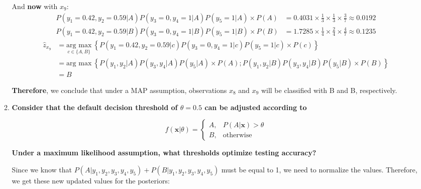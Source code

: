 \documentclass[12pt]{article}
\begin{document}
\begin{enumerate}[leftmargin=\labelsep]
\begin{enumerate}
                And \textbf{now} with $x_9$:
                $$
                  \begin{aligned}
                    P(y_1 = 0.42, y_2 = 0.59 | A) P(y_3 = 0, y_4 = 1 | A) P(y_5 = 1 | A) \times P(A) & = 0.4031 \times \frac{1}{3} \times \frac{1}{3} \times \frac{3}{7} \approx 0.0192 \\
                    P(y_1 = 0.42, y_2 = 0.59 | B) P(y_3 = 0, y_4 = 1 | B) P(y_5 = 1 | B) \times P(B) & = 1.7285 \times \frac{1}{4} \times \frac{2}{4} \times \frac{4}{7} \approx 0.1235
                  \end{aligned}
                $$
                $$
                  \begin{aligned}
                    \hat{z}_{x_9} & = \underset{c \in \{A, B\}}{\text{arg max}} \medspace \left\{P(y_1 = 0.42, y_2 = 0.59 | c) P(y_3 = 0, y_4 = 1 | c) P(y_5 = 1 | c) \times P(c)\right\}    \\
                                  & = \text{arg max} \medspace \left\{P(y_1, y_2 | A) P(y_3, y_4 | A) P(y_5 | A) \times P(A); P(y_1, y_2 | B) P(y_3, y_4 | B) P(y_5 | B) \times P(B)\right\} \\
                                  & = B
                  \end{aligned}
                $$

                \textbf{Therefore}, we conclude that under a MAP assumption, observations $x_8$ and $x_9$ will be classified with B and B, respectively.

          \item \textbf{Consider that the default decision threshold of $\theta = 0.5$ can be adjusted according to}

                \[
                  f(\textbf{x}|\theta)=
                  \begin{cases}
                    A, & P(A|\textbf{x}) > \theta \\
                    B, & \text{otherwise}
                  \end{cases}
                \]

                \textbf{Under a maximum likelihood assumption, what thresholds optimize testing accuracy?}

                \vskip 0.3cm
                Since we know that $P(A|y_1, y_2, y_3, y_4, y_5) + P(B|y_1, y_2, y_3, y_4, y_5)$ must be equal to 1, we need to normalize the values.
                Therefore, we get these new updated values for the posteriors:


\end{enumerate}
\end{enumerate}
\end{document}
